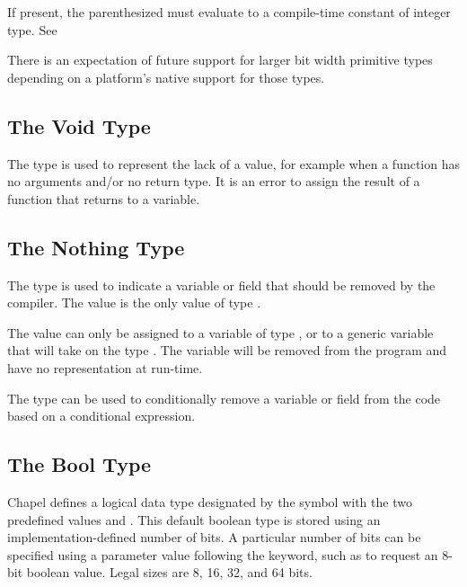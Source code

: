 If present, the parenthesized  must
evaluate to a compile-time constant of integer type.  See~

\begin{openissue}
There is an expectation of future support for larger bit width
primitive types depending on a platform's native support for those
types.
\end{openissue}

\subsection{The Void Type}
\label{The_Void_Type}

The  type is used to represent the lack of a value, for
example when a function has no arguments and/or no return type.
It is an error to assign the result of a function that returns
 to a variable.

\subsection{The Nothing Type}
\label{The_Nothing_type}

The  type is used to indicate a variable or field that
should be removed by the compiler. The value  is the only
value of type .

The value  can only be assigned to a variable of type
, or to a generic variable that will take on the type
. The variable will be removed from the program and
have no representation at run-time.

\begin{rationale}
The  type can be used to conditionally remove a variable
or field from the code based on a  conditional expression. 
\end{rationale}

\subsection{The Bool Type}
\label{The_Bool_Type}

Chapel defines a logical data type designated by the symbol
 with the two predefined values  and
.  This default boolean type is stored using an
implementation-defined number of bits.  A particular number of bits
can be specified using a parameter value following the 
keyword, such as  to request an 8-bit boolean value.
Legal sizes are 8, 16, 32, and 64 bits.

